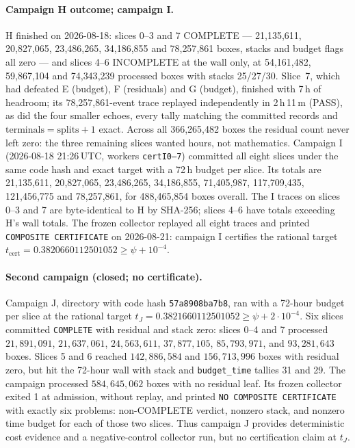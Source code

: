 \documentclass[11pt]{article}
\theoremstyle{plain}
\theoremstyle{definition}
\theoremstyle{remark}
\begin{document}
\paragraph{Campaign H outcome; campaign I.}
H finished on 2026-08-18: slices 0--3 and 7 COMPLETE --- 21{,}135{,}611,
20{,}827{,}065, 23{,}486{,}265, 34{,}186{,}855 and 78{,}257{,}861 boxes,
stacks and budget flags all zero --- and slices 4--6 INCOMPLETE at the wall
only, at 54{,}161{,}482, 59{,}867{,}104 and 74{,}343{,}239 processed boxes
with stacks 25/27/30. Slice~7, which had defeated E (budget), F (residuals)
and G (budget), finished with 7\,h of headroom; its 78{,}257{,}861-event
trace replayed independently in 2\,h\,11\,m (PASS), as did the four smaller
echoes, every tally matching the committed records and
$\text{terminals}=\text{splits}+1$ exact. Across all 366{,}265{,}482 boxes
the residual count never left zero: the three remaining slices wanted hours,
not mathematics. Campaign I (2026-08-18 21:26\,UTC, workers
\texttt{certI0--7}) committed all eight slices under the same code hash and
exact target with a 72\,h budget per slice. Its totals are
21{,}135{,}611, 20{,}827{,}065, 23{,}486{,}265, 34{,}186{,}855,
71{,}405{,}987, 117{,}709{,}435, 121{,}456{,}775 and 78{,}257{,}861,
for 488{,}465{,}854 boxes overall. The I traces on slices 0--3 and 7 are
byte-identical to H by SHA-256; slices 4--6 have totals exceeding H's wall
totals.  The frozen collector replayed all eight traces and printed
\texttt{COMPOSITE CERTIFICATE} on 2026-08-21: campaign I certifies the
rational target
$t_{\mathrm{cert}}=0.3820660112501052\ge\psi+10^{-4}$.

\paragraph{Second campaign (closed; no certificate).}
Campaign J, directory
with code hash \texttt{57a8908ba7b8}, ran with a 72-hour budget per slice at
the rational target
$t_J=0.3821660112501052\ge\psi+2\cdot10^{-4}$.  Six slices committed
\texttt{COMPLETE} with residual and stack zero: slices 0--4 and 7 processed
$21{,}891{,}091$, $21{,}637{,}061$, $24{,}563{,}611$, $37{,}877{,}105$,
$85{,}793{,}971$, and $93{,}281{,}643$ boxes.  Slices 5 and 6 reached
$142{,}886{,}584$ and $156{,}713{,}996$ boxes with residual zero, but hit the
72-hour wall with stack and \texttt{budget\_time} tallies 31 and 29.
The campaign processed $584{,}645{,}062$ boxes with no residual leaf.
Its frozen collector exited 1 at admission, without replay, and printed
\texttt{NO COMPOSITE CERTIFICATE} with exactly six problems: non-COMPLETE
verdict, nonzero stack, and nonzero time budget for each of those two slices.
Thus campaign J provides deterministic cost evidence and a negative-control
collector run, but no certification claim at $t_J$.
\end{document}

